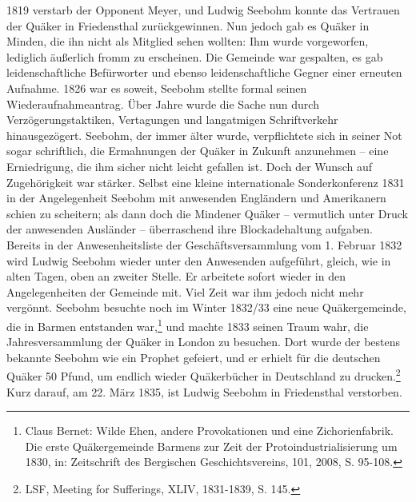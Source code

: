 1819 verstarb der Opponent Meyer, und Ludwig Seebohm konnte das Vertrauen der
Quäker in Friedensthal zurückgewinnen. Nun jedoch gab es Quäker in Minden, die
ihn nicht als Mitglied sehen wollten: Ihm wurde vorgeworfen, lediglich äußerlich
fromm zu erscheinen. Die Gemeinde war gespalten, es gab leidenschaftliche
Befürworter und ebenso leidenschaftliche Gegner einer erneuten Aufnahme. 1826
war es soweit, Seebohm stellte formal seinen Wiederaufnahmeantrag. Über Jahre
wurde die Sache nun durch Verzögerungstaktiken, Vertagungen und langatmigen
Schriftverkehr hinausgezögert. Seebohm, der immer älter wurde, verpflichtete
sich in seiner Not sogar schriftlich, die Ermahnungen der Quäker in Zukunft
anzunehmen -- eine Erniedrigung, die ihm sicher nicht leicht gefallen ist. Doch
der Wunsch auf Zugehörigkeit war stärker. Selbst eine kleine internationale
Sonderkonferenz 1831 in der Angelegenheit Seebohm mit anwesenden Engländern und
Amerikanern schien zu scheitern; als dann doch die Mindener Quäker -- vermutlich
unter Druck der anwesenden Ausländer -- überraschend ihre Blockadehaltung
aufgaben. Bereits in der Anwesenheitsliste der Geschäftsversammlung vom 1.
Februar 1832 wird Ludwig Seebohm wieder unter den Anwesenden aufgeführt, gleich,
wie in alten Tagen, oben an zweiter Stelle. Er arbeitete sofort wieder in den
Angelegenheiten der Gemeinde mit. Viel Zeit war ihm jedoch nicht mehr vergönnt.
Seebohm besuchte noch im Winter 1832/33 eine neue Quäkergemeinde, die in Barmen
entstanden war,\footnote{Claus Bernet: Wilde Ehen, andere Provokationen und eine
Zichorienfabrik.
Die erste Quäkergemeinde Barmens zur Zeit der Protoindustrialisierung um 1830,
in: Zeitschrift des Bergischen Geschichtsvereins, 101, 2008, S. 95-108.} und
machte 1833 seinen Traum wahr, die Jahresversammlung der Quäker in London zu
besuchen. Dort wurde der bestens bekannte Seebohm wie ein Prophet gefeiert, und
er erhielt für die deutschen Quäker 50 Pfund, um endlich wieder Quäkerbücher in
Deutschland zu drucken.\footnote{LSF, Meeting for Sufferings, XLIV, 1831-1839,
S. 145.} Kurz darauf, am 22. März 1835, ist Ludwig Seebohm in Friedensthal
verstorben.

\medskip

